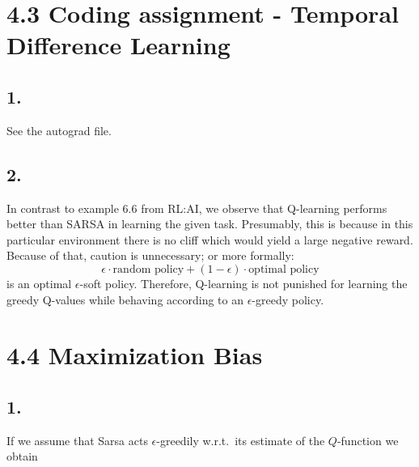 \documentclass{article}
\begin{document}
\begin{comment}
\section*{3.2 Importance Sampling in Monte Carlo methods}
\subsection*{1. Disadvantage of ordinary IS in off-policy MC}

\subsection*{2. Disadvantage of weighted IS in off-policy MC}
\end{comment}


\section*{4.3 Coding assignment - Temporal Difference Learning}
\subsection*{1.}
See the autograd file.

\subsection*{2.}
In contrast to example 6.6 from RL:AI, we observe that Q-learning performs better than SARSA in learning the given task. Presumably, this is because in this particular environment there is no cliff which would yield a large negative reward. Because of that, caution is unnecessary; or more formally: \[\epsilon \cdot \text{random policy} + (1 - \epsilon) \cdot \text{optimal policy}\] is an optimal \(\epsilon\)-soft policy. Therefore, Q-learning is not punished for learning the greedy Q-values while behaving according to an \(\epsilon\)-greedy policy.

\section*{4.4 Maximization Bias}
\subsection*{1.}

If we assume that Sarsa acts $\epsilon$-greedily w.r.t.\ its estimate of the $Q$-function we obtain
\end{document}
